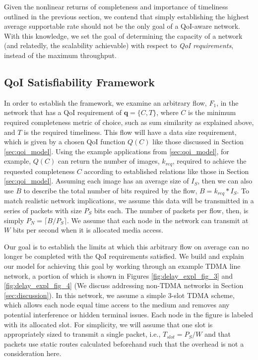 Given the nonlinear returns of completeness and importance of timeliness outlined in the previous section, we contend that simply establishing the highest average supportable rate should not be the only goal of a QoI-aware network.  With this knowledge, we set the goal of determining the capacity of a network (and relatedly, the scalability achievable) with respect to {\em QoI requirements}, instead of the maximum throughput.  

\subsection{QoI Satisfiability Framework}
In order to establish the framework, we examine an arbitrary flow, $F_1$, in the network that has a QoI requirement of $\mathbf{q} = \{C, T\}$, where $C$ is the minimum required completeness metric of choice, such as sum similarity as explained above, and $T$ is the required timeliness.  This flow will have a data size requirement, which is given by a chosen QoI function $Q(C)$ like those discussed in Section \ref{sec:qoi_model}.  Using the example applications from \ref{sec:qoi_model}, for example, $Q(C)$ can return the number of images, $k_{req}$, required to achieve the requested completeness $C$ according to established relations like those in Section \ref{sec:qoi_model}.  Assuming each image has an average size of $I_S$, then we can also use $B$ to describe the total number of bits required by the flow, $B=k_{req}*I_S$.  To match realistic network implications, we assume this data will be transmitted in a series of packets with size $P_S$ bits each.  The number of packets per flow, then, is simply $P_N = \lceil B/P_S \rceil$.  We assume that each node in the network can transmit at $W$ bits per second when it is allocated media access.

Our goal is to establish the limits at which this arbitrary flow on average can no longer be completed with the QoI requirements satisfied.  We build and explain our model for achieving this goal by working through an example TDMA line network, a portion of which is shown in Figures \ref{fig:delay_expl_fig_3} and \ref{fig:delay_expl_fig_4} (We discuss addressing non-TDMA networks in Section \ref{sec:discussion}).  In this network, we assume a simple 3-slot TDMA scheme, which allows each node equal time access to the medium and removes any potential interference or hidden terminal issues.  Each node in the figure is labeled with its allocated slot.  For simplicity, we will assume that one slot is appropriately sized to transmit a single packet, i.e., $T_{slot} = P_S/W$ and that packets use static routes calculated beforehand such that the overhead is not a consideration here.

